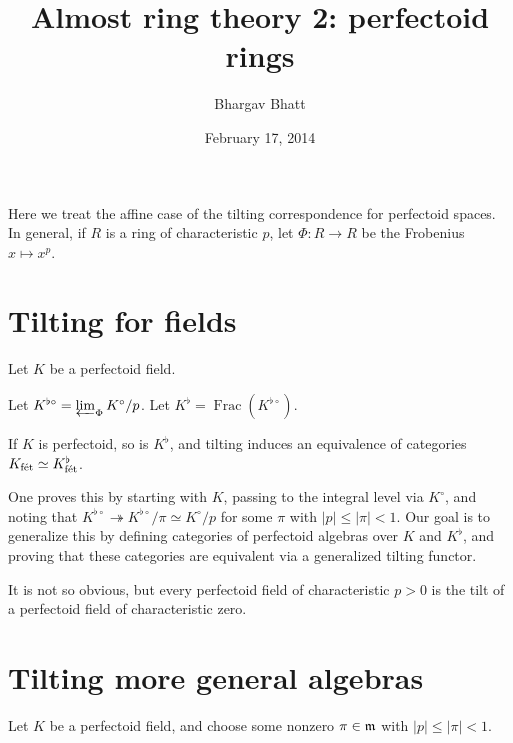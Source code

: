 \documentclass{article}
\title{Almost ring theory 2: perfectoid rings}
\author{Bhargav Bhatt}
\date{February 17, 2014}
\begin{document}
\maketitle





Here we treat the affine case of the tilting correspondence for perfectoid 
spaces. In general, if $R$ is a ring of characteristic $p$, let 
$\Phi:R\to R$ be the Frobenius $x\mapsto x^p$. 





\section{Tilting for fields}

Let $K$ be a perfectoid field. 

\begin{definition}
Let $K^{\flat\circ} = \varprojlim_\Phi K^\circ/p$. Let 
$K^\flat=\operatorname{Frac}(K^{\flat\circ})$. 
\end{definition}

\begin{theorem}
If $K$ is perfectoid, so is $K^\flat$, and tilting induces an equivalence of 
categories $K_{\textnormal{f\'et}}\simeq K_{\textnormal{f\'et}}^\flat$. 
\end{theorem}

One proves this by starting with $K$, passing to the integral level via 
$K^\circ$, and noting 
that $K^{\flat\circ}\twoheadrightarrow K^{\flat\circ}/\pi \simeq K^\circ/p$ for 
some $\pi$ with $|p|\leqslant |\pi|<1$. Our goal is to generalize this by 
defining categories of perfectoid algebras over $K$ and $K^\flat$, and proving 
that these categories are equivalent via a generalized tilting functor. 

It is not so obvious, but every perfectoid field of characteristic $p>0$ is 
the tilt of a perfectoid field of characteristic zero. 





\section{Tilting more general algebras}

Let $K$ be a perfectoid field, and choose some nonzero $\pi\in\mathfrak{m}$ with 
$|p|\leqslant |\pi| < 1$. 
\end{document}
